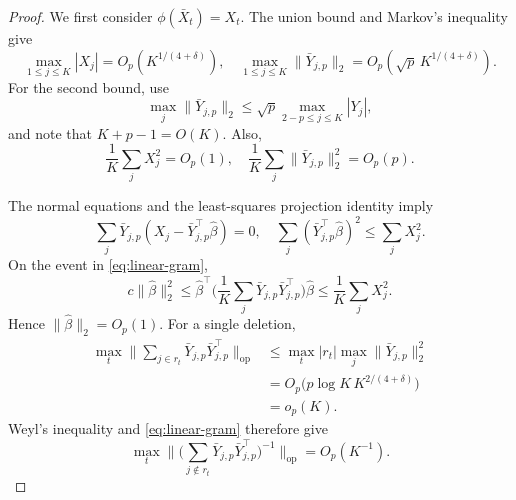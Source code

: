\documentclass[12pt]{article}
\numberwithin{equation}{section}
\begin{document}
\begin{proof}
We first consider $\phi(\bar X_t)=X_t$.
The union bound and Markov's inequality give
\begin{equation}
\label{eq:linear-max-bound}
\max_{1\leq j\leq K}|X_j|
=O_p(K^{1/(4+\delta)}),
\quad
\max_{1\leq j\leq K}\|\bar Y_{j,p}\|_2
=O_p(\sqrt p\,K^{1/(4+\delta)}).
\end{equation}
For the second bound, use
\[
\max_j\|\bar Y_{j,p}\|_2
\leq
\sqrt p\max_{2-p\leq j\leq K}|Y_j|,
\]
and note that $K+p-1=O(K)$.
Also,
\begin{equation}
\label{eq:linear-average-bound}
\frac1K\sum_jX_j^2=O_p(1),
\quad
\frac1K\sum_j\|\bar Y_{j,p}\|_2^2=O_p(p).
\end{equation}

The normal equations and the least-squares projection identity
imply
\[
\sum_j\bar Y_{j,p}
(X_j-\bar Y_{j,p}^\top\hat\beta)=0,
\quad
\sum_j(\bar Y_{j,p}^\top\hat\beta)^2
\leq\sum_jX_j^2.
\]
On the event in \eqref{eq:linear-gram},
\[
c\|\hat\beta\|_2^2
\leq
\hat\beta^\top
\big(
\frac1K\sum_j\bar Y_{j,p}\bar Y_{j,p}^\top
\big)\hat\beta
\leq
\frac1K\sum_jX_j^2.
\]
Hence $\|\hat\beta\|_2=O_p(1)$. For a single deletion,
\begin{align*}
\max_t
\Big\|
\sum_{j\in r_t}\bar Y_{j,p}\bar Y_{j,p}^\top
\Big\|_{\mathrm{op}}
&\leq
\max_t|r_t|\max_j\|\bar Y_{j,p}\|_2^2\\
&=
O_p\big(p\log K\,K^{2/(4+\delta)}\big)\\
&=o_p(K).
\end{align*}
Weyl's inequality and \eqref{eq:linear-gram} therefore give
\begin{equation}
\label{eq:linear-deleted-inverse}
\max_t
\Big\|
\big(
\sum_{j\notin r_t}
\bar Y_{j,p}\bar Y_{j,p}^\top
\big)^{-1}
\Big\|_{\mathrm{op}}
=O_p(K^{-1}).
\end{equation}


\end{proof}
\end{document}
